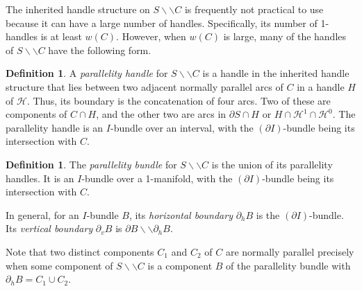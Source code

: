 \documentclass[oneside]{amsart}
\numberwithin{equation}{section}
\theoremstyle{plain}
\theoremstyle{definition}
\newtheorem{definition}[equation]{Definition}
\newcommand{\cut}{\backslash\backslash}
\newcommand{\calH}{\mathcal{H}}
\begin{document}
The inherited handle structure on $S \cut C$ is frequently not practical to use because it can have a large number of handles. Specifically, its number of 1-handles is at least $w(C)$. However, when $w(C)$ is large, many of the handles of $S \cut C$ have the following form.

\begin{definition}
A \emph{parallelity handle} for $S \cut C$ is a handle in the inherited handle structure that lies between two adjacent normally parallel arcs of $C$ in a handle $H$ of $\calH$. Thus, its boundary is the concatenation of four arcs. Two of these are components of $C \cap H$, and the other two are arcs in $\partial S \cap H$ or $H \cap \calH^1 \cap \calH^0$. The parallelity handle is an $I$-bundle over an interval, with the $(\partial I)$-bundle being its intersection with $C$.
\end{definition}

\begin{definition}
The \emph{parallelity bundle} for $S \cut C$ is the union of its parallelity handles. It is an $I$-bundle over a 1-manifold, with the $(\partial I)$-bundle being its intersection with $C$.
\end{definition}

In general, for an $I$-bundle $B$, its \emph{horizontal boundary} $\partial_h B$ is the $(\partial I)$-bundle. Its \emph{vertical boundary} $\partial_v B$ is $\partial B \cut \partial_h B$.

Note that two distinct components $C_1$ and $C_2$ of $C$ are normally parallel precisely when some component of $S \cut C$ is a component $B$ of the parallelity bundle with $\partial_h B = C_1 \cup C_2$.


\end{document}

